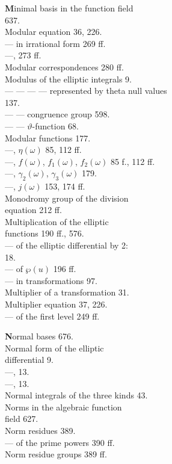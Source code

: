 \begin{minipage}[t]{0.48\textwidth}
\noindent \textbf{M}inimal basis in the function field\\
637.\\
Modular equation 36, 226.\\
--- in irrational form 269 ff.\\
---,  273 ff.\\
Modular correspondences 280 ff.\\
Modulus of the elliptic integrals 9.\\
--- --- --- --- represented by theta null values\\
137.\\
--- --- congruence group 598.\\
--- --- $\vartheta$-function 68.\\
Modular functions 177.\\
---, $\eta(\omega)$ 85, 112 ff.\\
---, $f(\omega)$, $f_1(\omega)$, $f_2(\omega)$ 85 f., 112 ff.\\
---, $\gamma_2(\omega)$, $\gamma_3(\omega)$ 179.\\
---, $j(\omega)$ 153, 174 ff.\\
Monodromy group of the division\\
equation 212 ff.\\
Multiplication of the elliptic\\
functions 190 ff., 576.\\
--- of the elliptic differential by 2:\\
18.\\
--- of $\wp(u)$ 196 ff.\\
--- in transformations 97.\\
Multiplier of a transformation 31.\\
Multiplier equation 37, 226.\\
--- of the first level 249 ff.

\noindent \textbf{N}ormal bases 676.\\
Normal form of the elliptic\\
differential 9.\\
---,  13.\\
---,  13.\\
Normal integrals of the three kinds 43.\\
Norms in the algebraic function\\
field 627.\\
Norm residues 389.\\
--- of the prime powers 390 ff.\\
Norm residue groups 389 ff.
\end{minipage}
